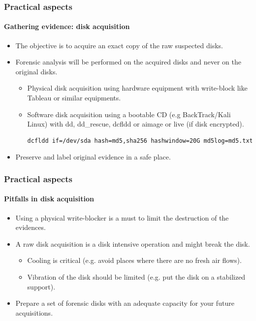 \begin{frame}[fragile]
\frametitle{Practical aspects}
\framesubtitle{Gathering evidence: disk acquisition}
\begin{itemize}
\item The objective is to acquire an exact copy of the raw suspected disks.
\item Forensic analysis will be performed on the acquired disks and never on the original disks.
\begin{itemize}
\item Physical disk acquisition using hardware equipment with write-block like Tableau or similar equipments.
\item Software disk acquisition using a bootable CD (e.g BackTrack/Kali Linux) with dd, dd\_rescue, dcfldd or aimage or live (if disk encrypted).
\begin{lstlisting}[language=bash,breaklines=true]
dcfldd if=/dev/sda hash=md5,sha256 hashwindow=20G md5log=md5.txt sha256log=sha256.txt hashconv=after bs=512 conv=noerror,sync split=20G splitformat=aa of=sda.dd
\end{lstlisting}
\end{itemize}
\item Preserve and label original evidence in a safe place.
\end{itemize}
\end{frame}

\begin{frame}[fragile]
\frametitle{Practical aspects}
\framesubtitle{Pitfalls in disk acquisition}
\begin{itemize}
        \item Using a physical write-blocker is a must to limit the destruction of the evidences.
        \item A raw disk acquisition is a disk intensive operation and might break the disk.
        \begin{itemize}
                \item Cooling is critical (e.g. avoid places where there are no fresh air flows).
                \item Vibration of the disk should be limited (e.g. put the disk on a stabilized support).
        \end{itemize}
        \item Prepare a set of forensic disks with an adequate capacity for your future acquisitions.
\end{itemize}
\end{frame}

